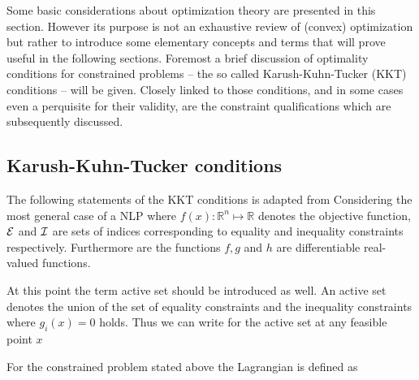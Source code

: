 Some basic considerations about optimization theory are presented in this section. However its purpose is not
an exhaustive review of (convex) optimization but rather to introduce some elementary concepts and terms that will
prove useful in the following sections. Foremost a brief discussion of optimality conditions for constrained
problems -- the so called Karush-Kuhn-Tucker (KKT) conditions -- will be given. Closely linked to those conditions,
and in some cases even a perquisite for their validity, are the constraint qualifications which are subsequently
discussed.

    \subsection{Karush-Kuhn-Tucker conditions}
    \label{sec:opt:theory:kkt}
    The following statements of the KKT conditions is adapted from \cite{Nocedal.2006}
    Considering the most general case of a NLP
    where $f(x): \mathbb{R}^n \mapsto \mathbb{R}$ denotes the objective function, $\mathcal{E}$ and $\mathcal{I}$
    are sets of indices corresponding to equality and inequality constraints respectively. Furthermore are the functions 
     $f, g$ and $h$ are differentiable real-valued functions. 
     
    At this point the term active set should be introduced as well. An active set denotes the union of the set of 
    equality constraints and the inequality constraints where $g_i(x) = 0$ holds. Thus we can write for the active
    set at any feasible point $x$
    
    For the constrained problem stated above the Lagrangian is defined as 

